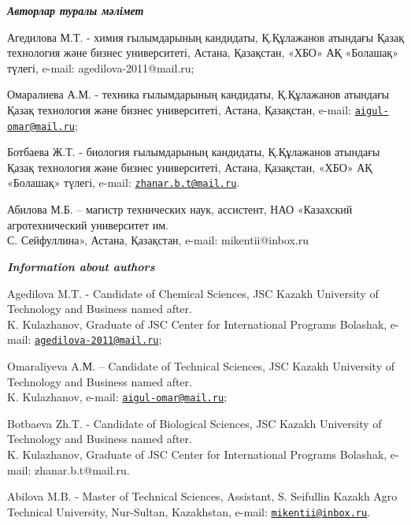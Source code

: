 \begin{authorinfo}
\hspace{1em}\emph{{\bfseries Авторлар туралы мәлімет}}

Агедилова М.Т. - химия ғылымдарының кандидаты, Қ.Құлажанов атындағы
Қазақ технология және бизнес университеті, Астана, Қазақстан, «ХБО» АҚ
«Болашақ» түлегі, e-mail: agedilova-2011@mail.ru;

Омаралиева А.М. - техника ғылымдарының кандидаты, Қ.Құлажанов атындағы
Қазақ технология және бизнес университеті, Астана, Қазақстан, e-mail:
\href{mailto:aigul-omar@mail.ru}{\nolinkurl{aigul-omar@mail.ru}};

Ботбаева Ж.Т. - биология ғылымдарының кандидаты, Қ.Құлажанов атындағы
Қазақ технология және бизнес университеті, Астана, Қазақстан, «ХБО» АҚ
«Болашақ» түлегі, e-mail:
\href{mailto:zhanar.b.t@mail.ru}{\nolinkurl{zhanar.b.t@mail.ru}}.

Абилова М.Б. -- магистр технических наук, ассистент, НАО «Казахский
агротехнический университет им.\\ С. Сейфуллина», Астана, Қазақстан,
e-mail: mikentii@inbox.ru

\hspace{1em}\emph{{\bfseries Information about authors}}

Agedilova M.T. - Candidate of Chemical Sciences, JSC Kazakh University
of Technology and Business named after. \\K. Kulazhanov, Graduate of JSC
Center for International Programs Bolashak, e-mail:
\href{mailto:agedilova-2011@mail.ru}{\nolinkurl{agedilova-2011@mail.ru}};

Omaraliyeva A.М. -- Candidate of Technical Sciences, JSC Kazakh
University of Technology and Business named after. \\K. Kulazhanov,
e-mail:
\href{mailto:aigul-omar@mail.ru}{\nolinkurl{aigul-omar@mail.ru}};

Botbaeva Zh.T. - Candidate of Biological Sciences, JSC Kazakh University
of Technology and Business named after. \\K. Kulazhanov, Graduate of JSC
Center for International Programs Bolashak, e-mail: zhanar.b.t@mail.ru.

Abilova M.B. - Master of Technical Sciences, Assistant, S. Seifullin
Kazakh Agro Technical University, Nur-Sultan, Kazakhstan, e-mail:
\href{mailto:mikentii@inbox.ru}{\nolinkurl{mikentii@inbox.ru}}.
\end{authorinfo}
